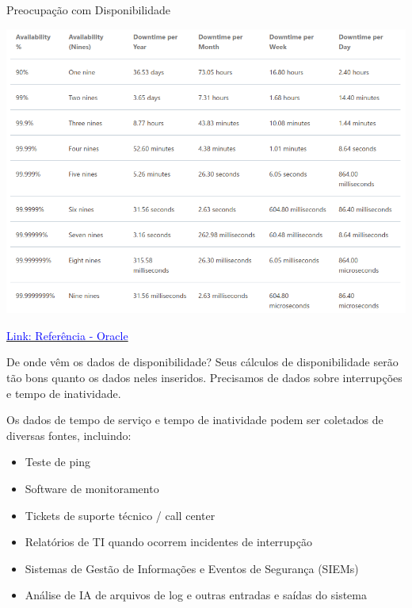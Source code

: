 \begin{frame}{Preocupação com Disponibilidade}
    \centering

    \includegraphics[width=0.7\linewidth]{Figuras/9s-disponibilidade.png}


    \href{https://docs.oracle.com/en-us/iaas/Content/cloud-adoption-framework/high-availability.htm}{\textcolor{blue}{Link: Referência - Oracle}}

\end{frame}

\begin{frame}{De onde vêm os dados de disponibilidade?}
    Seus cálculos de disponibilidade serão tão bons quanto os dados neles inseridos. Precisamos de dados  sobre interrupções e tempo de inatividade.

    Os dados de tempo de serviço e tempo de inatividade podem ser coletados de diversas fontes, incluindo:

    \vspace{0.3cm}
    \begin{itemize}
        \item Teste de ping
        \item Software de monitoramento
        \item Tickets de suporte técnico / call center
        \item Relatórios de TI quando ocorrem incidentes de interrupção
        \item Sistemas de Gestão de Informações e Eventos de Segurança (SIEMs)
        \item Análise de IA de arquivos de log e outras entradas e saídas do sistema
    \end{itemize}


\end{frame}



